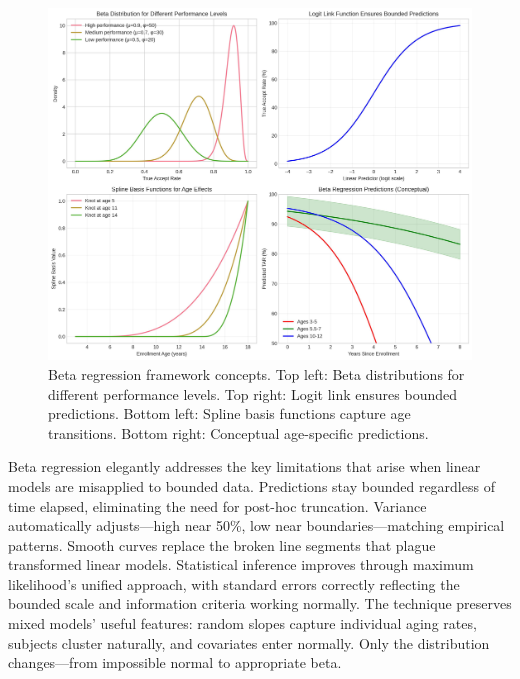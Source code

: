 \documentclass[10pt,journal,compsoc]{IEEEtran}
\begin{document}
\begin{figure}[htbp]
\centering
\includegraphics[width=\textwidth]{beta_regression_concepts.pdf}
\caption{Beta regression framework concepts. Top left: Beta distributions for different performance levels. Top right: Logit link ensures bounded predictions. Bottom left: Spline basis functions capture age transitions. Bottom right: Conceptual age-specific predictions.}
\label{fig:beta-concepts}
\end{figure}

Beta regression elegantly addresses the key limitations that arise when linear models are misapplied to bounded data. Predictions stay bounded regardless of time elapsed, eliminating the need for post-hoc truncation. Variance automatically adjusts---high near 50\%, low near boundaries---matching empirical patterns. Smooth curves replace the broken line segments that plague transformed linear models. Statistical inference improves through maximum likelihood's unified approach, with standard errors correctly reflecting the bounded scale and information criteria working normally. The technique preserves mixed models' useful features: random slopes capture individual aging rates, subjects cluster naturally, and covariates enter normally. Only the distribution changes---from impossible normal to appropriate beta.
\end{document}
